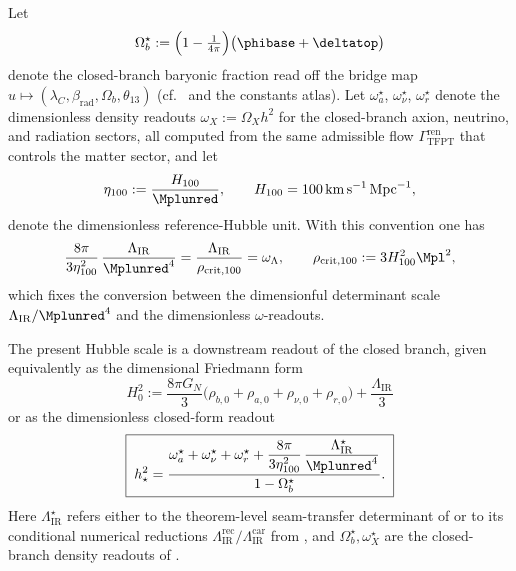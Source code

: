 \begin{definition}
\label{def:closed-branch-density-readouts}
Let
\[
\Omega_b^\star
:=
\Bigl(1-\tfrac{1}{4\pi}\Bigr)\bigl(\phibase+\deltatop\bigr)
\]
denote the closed-branch baryonic fraction read off the bridge map
$u\mapsto(\lambda_C,\beta_{\mathrm{rad}},\Omega_b,\theta_{13})$ (cf.\ 
and the constants atlas). Let $\omega_a^\star$, $\omega_\nu^\star$, $\omega_r^\star$ denote the
dimensionless density readouts $\omega_X:=\Omega_X h^2$ for the closed-branch axion, neutrino, and
radiation sectors, all computed from the same admissible flow $\Gamma_{\mathrm{TFPT}}^{\mathrm{ren}}$
that controls the matter sector, and let
\[
\eta_{100}
:=
\frac{H_{100}}{\Mplunred},
\qquad
H_{100}=100\,\mathrm{km}\,\mathrm{s}^{-1}\,\mathrm{Mpc}^{-1},
\]
denote the dimensionless reference-Hubble unit. With this convention one has
\[
\frac{8\pi}{3\eta_{100}^2}\,\frac{\Lambda_{\mathrm{IR}}}{\Mplunred^4}
=
\frac{\Lambda_{\mathrm{IR}}}{\rho_{\mathrm{crit},100}}
=
\omega_\Lambda,
\qquad
\rho_{\mathrm{crit},100}:=3H_{100}^2\Mpl^2,
\]
which fixes the conversion between the dimensionful determinant scale
$\Lambda_{\mathrm{IR}}/\Mplunred^4$ and the dimensionless $\omega$-readouts.
\end{definition}

\begin{conjecture}
\label{cor:late_time_hubble_readout}
The present Hubble scale is a downstream readout of the closed branch, given equivalently as the
dimensional Friedmann form
\[
H_0^2
:=
\frac{8\pi G_N}{3}\bigl(\rho_{b,0}+\rho_{a,0}+\rho_{\nu,0}+\rho_{r,0}\bigr)
+\frac{\Lambda_{\mathrm{IR}}}{3}
\]
or as the dimensionless closed-form readout
\[
\boxed{\;
h_\star^2
=
\frac{
\omega_a^\star+\omega_\nu^\star+\omega_r^\star
+\dfrac{8\pi}{3\eta_{100}^2}\,\dfrac{\Lambda_{\mathrm{IR}}^\star}{\Mplunred^4}
}{
1-\Omega_b^\star
}.\;}
\]
Here $\Lambda_{\mathrm{IR}}^\star$ refers either to the theorem-level seam-transfer determinant of
 or to its conditional numerical reductions
$\Lambda_{\mathrm{IR}}^{\mathrm{rec}}/\Lambda_{\mathrm{IR}}^{\mathrm{car}}$ from
, and $\Omega_b^\star,\omega_X^\star$ are the closed-branch
density readouts of .
\end{conjecture}

